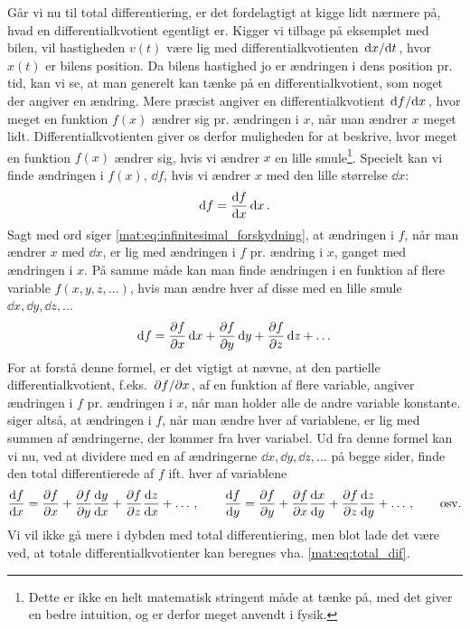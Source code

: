 Går vi nu til total differentiering, er det fordelagtigt at kigge lidt nærmere på, hvad en differentialkvotient egentligt er. Kigger vi tilbage på eksemplet med bilen, vil hastigheden $v(t)$ være lig med differentialkvotienten $\dv*{x}{t}$, hvor $x(t)$ er bilens position. Da bilens hastighed jo er ændringen i dens position pr. tid, kan vi se, at man generelt kan tænke på en differentialkvotient, som noget der angiver en ændring. Mere præcist angiver en differentialkvotient $\dv*{f}{x}$, hvor meget en funktion $f(x)$ ændrer sig pr. ændringen i $x$, når man ændrer $x$ meget lidt. Differentialkvotienten giver os derfor muligheden for at beskrive, hvor meget en funktion $f(x)$ ændrer sig, hvis vi ændrer $x$ en lille smule\footnote{Dette er ikke en helt matematisk stringent måde at tænke på, med det giver en bedre intuition, og er derfor meget anvendt i fysik.}. Specielt kan vi finde ændringen i $f(x)$, $\dd{f}$, hvis vi ændrer $x$ med den lille størrelse $\dd{x}$:
%
\begin{align} \label{mat:eq:infinitesimal_forskydning}
    \dd{f} = \dv{f}{x} \dd{x}.
\end{align}
%
Sagt med ord siger \cref{mat:eq:infinitesimal_forskydning}, at ændringen i $f$, når man ændrer $x$ med $\dd{x}$, er lig med ændringen i $f$ pr. ændring i $x$, ganget med ændringen i $x$. På samme måde kan man finde ændringen i en funktion af flere variable $f(x,y,z,\dots{})$, hvis man ændre hver af disse med en lille smule $\dd{x},\dd{y},\dd{z},...$
%
\begin{align} \label{df_func}
    \dd{f} = \pdv{f}{x} \dd{x} + \pdv{f}{y} \dd{y} + \pdv{f}{z} \dd{z} + \dots{}
\end{align}
%
For at forstå denne formel, er det vigtigt at nævne, at den partielle differentialkvotient, f.eks. $\pdv*{f}{x}$, af en funktion af flere variable, angiver ændringen i $f$ pr. ændringen i $x$, når man holder alle de andre variable konstante.  siger altså, at ændringen i $f$, når man ændre hver af variablene, er lig med summen af ændringerne, der kommer fra hver variabel. Ud fra denne formel kan vi nu, ved at dividere med en af ændringerne $\dd{x}, \dd{y}, \dd{z}, \dots{}$ på begge sider, finde den total differentierede af $f$ ift. hver af variablene
%
\begin{align} \label{mat:eq:total_dif}
    \dv{f}{x} = \pdv{f}{x} + \pdv{f}{y} \dv{y}{x} + \pdv{f}{z} \dv{z}{x} + \dots{} \, , \qquad \dv{f}{y} = \pdv{f}{y} + \pdv{f}{x} \dv{x}{y} + \pdv{f}{z} \dv{z}{y} + \dots{} \, , \qquad \text{osv.}
\end{align}
%
Vi vil ikke gå mere i dybden med total differentiering, men blot lade det være ved, at totale differentialkvotienter kan beregnes vha. \cref{mat:eq:total_dif}. 

